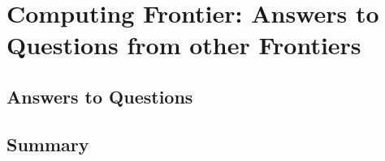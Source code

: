  
\chapter{Computing Frontier: Answers to Questions from other Frontiers}
\label{chap:mag}


\begin{center}\begin{boldmath}

%

\end{boldmath}\end{center}


\section{Answers to Questions}
\label{sec:comp-intro}





\section{Summary}
\label{sec:comp-summary}




